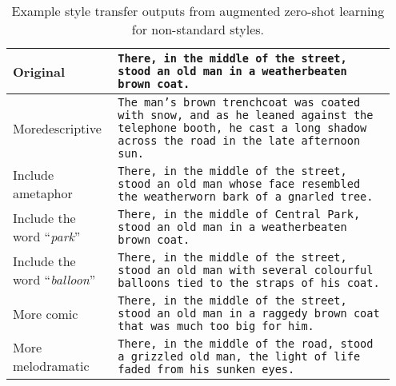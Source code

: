 \begin{table}[]
    \caption{Example style transfer outputs from augmented zero-shot learning for non-standard styles. }  %
  \label{tab:style-transfer-examples}%
\setlength{\tabcolsep}{3.3pt}
  \small
    \label{fig:visualizer_results}
    \begin{tabular}{p{0.25\linewidth}>{\scriptsize}p{0.7\linewidth}}
    \toprule
    Original & \texttt{There, in the middle of the street, stood an old man in a weatherbeaten brown coat.} \\
    \hline
    More\newline descriptive &
    \texttt{The man's brown trenchcoat was coated with snow, and as he leaned against the telephone booth, he cast a long shadow across the road in the late afternoon sun.}\\
    \hline
    Include a\newline metaphor &
    \texttt{There, in the middle of the street, stood an old man whose face resembled the weatherworn bark of a gnarled tree.}\\
    \hline
    Include the \newline word ``\textit{park}'' & \texttt{There, in the middle of Central Park, stood an old man in a weatherbeaten brown coat.} \\
    \hline
    Include the \newline word ``\textit{balloon}'' & \texttt{There, in the middle of the street, stood an old man with several colourful balloons tied to the straps of his coat.} \\
    \hline
    More comic & \texttt{There, in the middle of the street, stood an old man in a raggedy brown coat that was much too big for him.} \\
    \hline
    More melodramatic & \texttt{There, in the middle of the road, stood a grizzled old man, the light of life faded from his sunken eyes.}\\
    \bottomrule
    \end{tabular}%
    \vspace{-1mm}
\end{table}%






